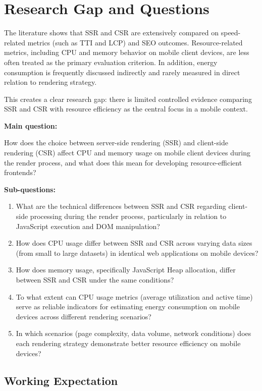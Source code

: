 \section{Research Gap and Questions}

The literature shows that SSR and CSR are extensively compared on speed-related metrics (such as TTI and LCP) and SEO outcomes. Resource-related metrics, including CPU and memory behavior on mobile client devices, are less often treated as the primary evaluation criterion. In addition, energy consumption is frequently discussed indirectly and rarely measured in direct relation to rendering strategy.

This creates a clear research gap: there is limited controlled evidence comparing SSR and CSR with resource efficiency as the central focus in a mobile context.

\textbf{Main question:}

How does the choice between server-side rendering (SSR) and client-side rendering (CSR) affect CPU and memory usage on mobile client devices during the render process, and what does this mean for developing resource-efficient frontends?

\textbf{Sub-questions:}

\begin{enumerate}
	\item What are the technical differences between SSR and CSR regarding client-side processing during the render process, particularly in relation to JavaScript execution and DOM manipulation?
	\item How does CPU usage differ between SSR and CSR across varying data sizes (from small to large datasets) in identical web applications on mobile devices?
	\item How does memory usage, specifically JavaScript Heap allocation, differ between SSR and CSR under the same conditions?
	\item To what extent can CPU usage metrics (average utilization and active time) serve as reliable indicators for estimating energy consumption on mobile devices across different rendering scenarios?
	\item In which scenarios (page complexity, data volume, network conditions) does each rendering strategy demonstrate better resource efficiency on mobile devices?
\end{enumerate}

\subsection*{Working Expectation}

